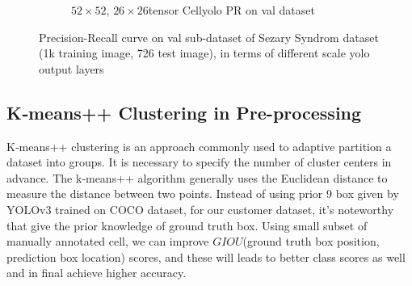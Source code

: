 \begin{figure}[h]
\begin{center}
\begin{subfigure}[b]{0.49\textwidth}
			\caption{$52 \times 52$, $26 \times 26$tensor Cellyolo PR on val dataset}
			\label{fig:cellnet}
		\end{subfigure}
	\end{center}
	\caption{Precision-Recall curve on val sub-dataset of Sezary Syndrom dataset (1k training image, 726 test image), in terms of different scale yolo output layers}
\end{figure}



\subsection{K‐means++ Clustering in Pre-processing}

K‐means++ clustering is an approach commonly used to adaptive partition a dataset into groups. It is necessary to specify the number of cluster centers in advance. The k‐means++ algorithm generally uses the Euclidean distance to measure the distance between two points. Instead of using prior 9 box given by YOLOv3 trained on COCO dataset, for our customer dataset, it's noteworthy that give the prior knowledge of ground truth box. Using small subset of manually annotated cell, we can improve $GIOU$(ground truth box position, prediction box location) scores, and these will leads to better class scores as well and in final achieve higher accuracy.

